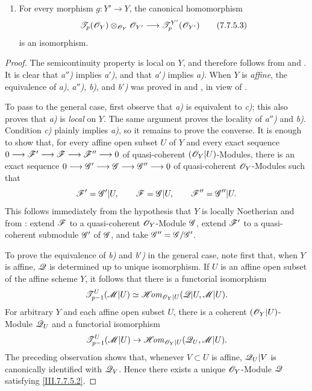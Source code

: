 {\begin{theorem}[7.7.5]
\begin{enumerate}
  \item[\textup{d)}] For every morphism $g:Y'\to Y$, the canonical
    homomorphism
    \[
      \mathscr{T}_p(\mathscr{O}_Y)
      \otimes_{\mathscr{O}_Y}\mathscr{O}_{Y'}
      \longrightarrow
      \mathscr{T}^{Y'}_p(\mathscr{O}_{Y'})
      \tag{7.7.5.3}\label{III.7.7.5.3}
    \]
    is an isomorphism.
\end{enumerate}
\end{theorem}

\begin{proof}
The semicontinuity property is local on $Y$, and therefore
follows from  and .  It is
clear that \emph{a$''$)} implies \emph{a$'$)}, and that \emph{a$'$)} implies \emph{a)}.
When $Y$ is \emph{affine}, the equivalence of \emph{a)}, \emph{a$''$)}, \emph{b)}, and
\emph{b$'$)} was proved in  and
, in view of .

To pass to the general case, first observe that \emph{a)} is
equivalent to \emph{c)}; this also proves that \emph{a)} is \emph{local} on $Y$.
The same argument proves the locality of \emph{a$''$)} and \emph{b)}.
Condition \emph{c)} plainly implies \emph{a)}, so it remains to prove the
converse.  It is enough to show that, for every affine open
subset $U$ of $Y$ and every exact sequence $0\longrightarrow\mathscr{F}'
\longrightarrow\mathscr{F}
\longrightarrow\mathscr{F}''
\longrightarrow0$
of quasi-coherent $(\mathscr{O}_Y|U)$-Modules, there is an exact
sequence $0\longrightarrow\mathscr{G}'
\longrightarrow\mathscr{G}
\longrightarrow\mathscr{G}''
\longrightarrow0$
of quasi-coherent $\mathscr{O}_Y$-Modules such that
\[
  \mathscr{F}'=\mathscr{G}'|U,
  \qquad
  \mathscr{F}=\mathscr{G}|U,
  \qquad
  \mathscr{F}''=\mathscr{G}''|U.
\]
This follows immediately from the hypothesis that $Y$ is
locally Noetherian and from : extend
$\mathscr{F}$ to a quasi-coherent $\mathscr{O}_Y$-Module $\mathscr{G}$,
extend $\mathscr{F}'$ to a quasi-coherent submodule $\mathscr{G}'$ of
$\mathscr{G}$, and take $\mathscr{G}''=\mathscr{G}/\mathscr{G}'$.

To prove the equivalence of \emph{b)} and \emph{b$'$)} in the general
case, note first that, when $Y$ is affine, $\mathscr{Q}$ is
determined up to unique isomorphism.  If $U$ is an affine
open subset of the affine scheme $Y$, it follows that there
is a functorial isomorphism
\[
  \mathscr{T}^{U}_{p-1}(\mathscr{M}|U)
  \simeq
  \mathscr{H}\!\mathit{om}_{\mathscr{O}_Y|U}
    (\mathscr{Q}|U,\mathscr{M}|U).
\]
For arbitrary $Y$ and each affine open subset $U$, there is
a coherent $(\mathscr{O}_Y|U)$-Module $\mathscr{Q}_U$ and a
functorial isomorphism
\[
  \mathscr{T}^{U}_{p-1}(\mathscr{M}|U)
  \to
  \mathscr{H}\!\mathit{om}_{\mathscr{O}_Y|U}
    (\mathscr{Q}_U,\mathscr{M}|U).
\]
The preceding observation shows that, whenever $V\subset U$
is affine, $\mathscr{Q}_U|V$ is canonically identified with
$\mathscr{Q}_V$.  Hence there exists a unique
$\mathscr{O}_Y$-Module $\mathscr{Q}$ satisfying
\eqref{III.7.7.5.2}.


\end{proof}}
